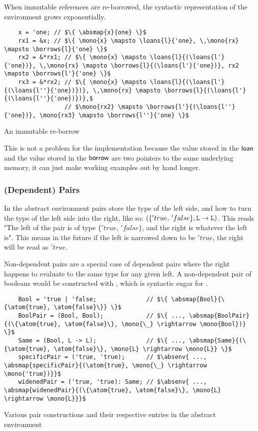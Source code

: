 \documentclass[12pt,twoside]{report}
\begin{document}
When immutable references are re-borrowed, the syntactic representation of the environment grows exponentially.

\begin{listing}[H]
  \begin{verbatim}
    x = 'one; // $\{ \absmap{x}{one} \}$
    rx1 = &x; // $\{ \mono{x} \mapsto \loans{l}{'one}, \,\mono{rx} \mapsto \borrows{l}{'one} \}$
    rx2 = &*rx1; // $\{ \mono{x} \mapsto \loans{l}{(\loans{l'}{'one})}, \,\mono{rx} \mapsto \borrows{l}{(\loans{l'}{'one})}, rx2 \mapsto \borrows{l'}{'one} \}$
    rx3 = &*rx2; // $\{ \mono{x} \mapsto \loans{l}{(\loans{l'}{(\loans{l''}{'one})})}, \,\mono{rx} \mapsto \borrows{l}{(\loans{l'}{(\loans{l''}{'one})})},$
                 // $\mono{rx2} \mapsto \borrows{l'}{(\loans{l''}{'one})}, \mono{rx3} \mapsto \borrows{l''}{'one} \}$
  \end{verbatim}
  \caption{An immutable re-borrow}
\end{listing}

This is not a problem for the implementation because the value stored in the $\mathsf{loan}$ and the value stored in the $\mathsf{borrow}$ are two pointers to the same underlying memory, it can just make working examples out by hand longer.

\subsubsection{(Dependent) Pairs}
In the abstract environment pairs store the type of the left side, and how to turn the type of the left side into the right, like so: $(\{'true, \, 'false\}, \text{\texttt{L}} \rightarrow \text{\texttt{L}})$. This reads "The left of the pair is of type $\{'true, \, 'false\}$, and the right is whatever the left is". This means in the future if the left is narrowed down to be $'true$, the right will be read as $'true$.

Non-dependent pairs are a special case of dependent pairs where the right happens to evaluate to the same type for any given left. A non-dependent pair of booleans would be constructed with , which is syntactic sugar for .

\begin{listing}[H]
  \begin{verbatim}
    Bool = 'true | 'false;              // $\{ \absmap{Bool}{\{\atom{true}, \atom{false}\}} \}$
    BoolPair = (Bool, Bool);            // $\{ ..., \absmap{BoolPair}{(\{\atom{true}, \atom{false}\}, \mono{\_} \rightarrow \mono{Bool})} \}$
    Same = (Bool, L -> L);              // $\{ ..., \absmap{Same}{(\{\atom{true}, \atom{false}\}, \mono{L} \rightarrow \mono{L}} \}$
    specificPair = ('true, 'true);      // $\absenv{ ..., \absmap{specificPair}{(\atom{true}, \mono{\_} \rightarrow \mono{'true})}}$
    widenedPair = ('true, 'true): Same; // $\absenv{ ..., \absmap{widenedPair}{(\{\atom{true}, \atom{false}\}, \mono{L} \rightarrow \mono{L}}}$
  \end{verbatim}
  \caption{Various pair constructions and their respective entries in the abstract environment}
\end{listing}
\end{document}
